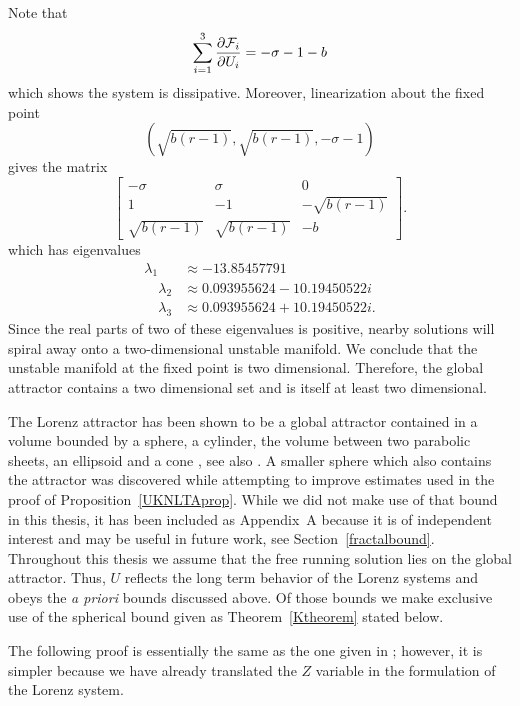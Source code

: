 \documentclass[master,tocprelim,12pt]{unrthesis}
\theoremstyle{definition}
\newcommand{\cF}{{\mathcal F}}
\numberwithin{equation}{chapter}
\begin{document}
\begin{manuscript}
Note that
$$
\displaystyle\sum_{i=1}^3{\partial \cF_i \over \partial U_i }
	=-\sigma-1-b
$$	
which shows the system is dissipative.
Moreover, linearization about the
fixed point $$(\sqrt{b(r-1)},\sqrt{b(r-1)},-\sigma-1)$$
gives the matrix
$$
\begin{bmatrix}
    -\sigma & \sigma & 0\\
    1 & -1 & -\sqrt{b(r-1)}\\
    \sqrt{b(r-1)} & \sqrt{b(r-1)} & -b
\end{bmatrix}.
$$
which has eigenvalues
\begin{align*}
	\lambda_1&\approx -13.85457791\\
\quad
	\lambda_2&\approx 0.093955624 - 10.19450522i\\
\quad
	\lambda_3&\approx 0.093955624 + 10.19450522i.
\end{align*}
Since the real parts of two of these eigenvalues is positive,
nearby solutions will
spiral away onto a two-dimensional unstable manifold. 
We conclude that the unstable manifold at the fixed point
is two dimensional.
Therefore, the global attractor contains a two dimensional
set and is itself at least two dimensional.

The Lorenz attractor has been shown to be a global 
attractor contained in a
volume bounded by a sphere, a cylinder, the volume between two parabolic sheets,
an ellipsoid and a cone \cite{Doering95a}, see
also \cite{Doering95b}.
A smaller sphere which also contains the attractor was 
discovered while attempting to improve estimates used in
the proof of Proposition~\ref{UKNLTAprop}.
While we did not make use of that bound in this thesis,
it has been included as Appendix~A because it is of independent
interest and may be useful in future work, see Section~\ref{fractalbound}.
Throughout this thesis we assume that
the free running solution lies on the global attractor.
Thus, $U$ reflects the long term behavior of the
Lorenz systems and obeys the {\it a priori\/} bounds discussed
above.
Of those bounds we make exclusive use of the spherical bound given 
as Theorem~\ref{Ktheorem} stated below.

The following proof
is essentially the same as the one given in \cite{Doering95a};
however, it is simpler because
we have already translated the $Z$ variable in the formulation 
of the Lorenz system.


\end{manuscript}
\end{document}
